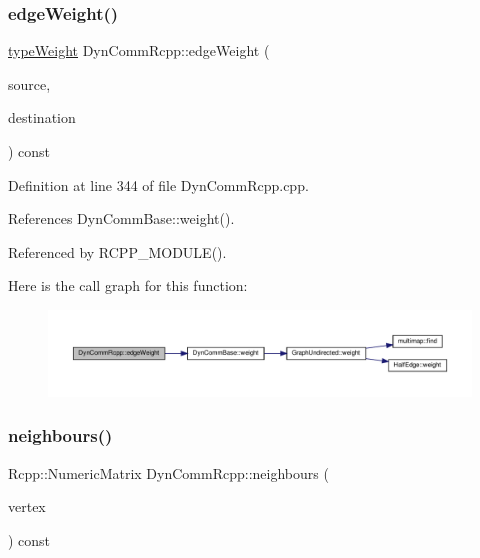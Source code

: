 \subsubsection{\texorpdfstring{edge\+Weight()}{edgeWeight()}}
{\footnotesize\ttfamily \hyperlink{edge_8h_a2e7ea3be891ac8b52f749ec73fee6dd2}{type\+Weight} Dyn\+Comm\+Rcpp\+::edge\+Weight (\begin{DoxyParamCaption}\item[{\hyperlink{edge_8h_a5fbd20c46956d479cb10afc9855223f6}{type\+Vertex}}]{source,  }\item[{\hyperlink{edge_8h_a5fbd20c46956d479cb10afc9855223f6}{type\+Vertex}}]{destination }\end{DoxyParamCaption}) const\hspace{0.3cm}{\ttfamily [inline]}}



Definition at line 344 of file Dyn\+Comm\+Rcpp.\+cpp.



References Dyn\+Comm\+Base\+::weight().



Referenced by R\+C\+P\+P\+\_\+\+M\+O\+D\+U\+L\+E().

Here is the call graph for this function\+:
\nopagebreak
\begin{figure}[H]
\begin{center}
\leavevmode
\includegraphics[width=350pt]{classDynCommRcpp_a9a9aaf2512541f308d935e48c583f410_cgraph}
\end{center}
\end{figure}
\mbox{\label{classDynCommRcpp_abbda8cc950c360c1b89859ebe9233535}} 
\subsubsection{\texorpdfstring{neighbours()}{neighbours()}}
{\footnotesize\ttfamily Rcpp\+::\+Numeric\+Matrix Dyn\+Comm\+Rcpp\+::neighbours (\begin{DoxyParamCaption}\item[{\hyperlink{edge_8h_a5fbd20c46956d479cb10afc9855223f6}{type\+Vertex}}]{vertex }\end{DoxyParamCaption}) const\hspace{0.3cm}{\ttfamily [inline]}}

